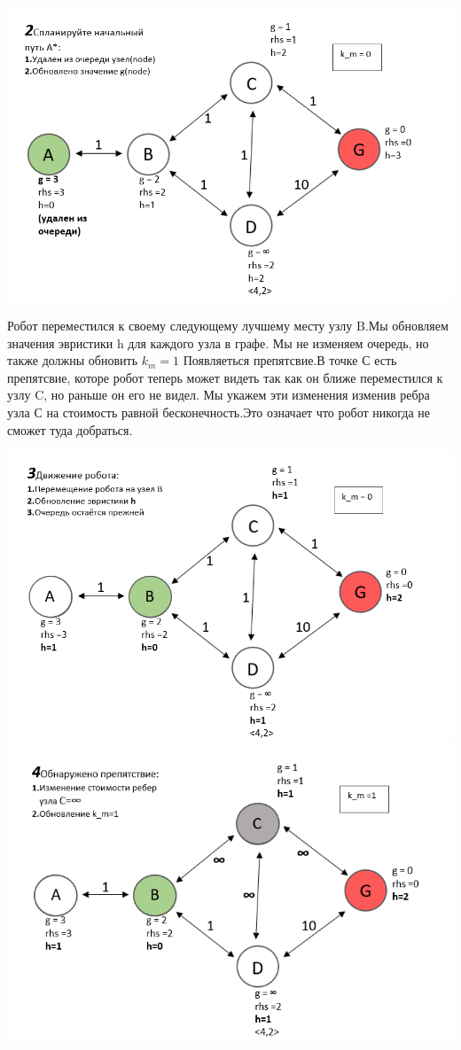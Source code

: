 \documentclass[12pt]{article}
\begin{document}
\begin{center}
        \includegraphics[width=1\textwidth]{img/example2_4.png}
    \end{center}
Робот переместился к своему следующему лучшему месту узлу B.Мы обновляем значения эвристики h для каждого узла в графе. Мы не изменяем очередь, но также должны обновить $k_m=1$ Появляеться препятсвие.В точке С есть препятсвие, которе робот теперь может видеть так как он ближе переместился к узлу C, но раньше он его не видел. Мы укажем эти изменения изменив ребра узла С на стоимость равной бесконечность.Это означает что робот никогда не сможет туда добраться.
\begin{center}
        \includegraphics[width=1\textwidth]{img/example3.png}
         \includegraphics[width=1\textwidth]{img/example4.png}
    \end{center}
\end{document}
